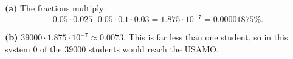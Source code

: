 \textbf{(a)} The fractions multiply:
\[0.05\cdot0.025\cdot0.05\cdot0.1\cdot0.03=1.875\cdot10^{-7}=\boxed{0.00001875\%}.\]

\textbf{(b)} $39000\cdot1.875\cdot10^{-7}\approx0.0073$. This is far less than one student, so in this system $\boxed{0}$ of the $39000$ students would reach the USAMO.

